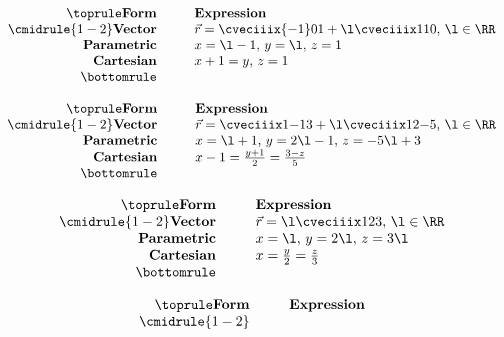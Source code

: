 \begin{solution}
    \begin{ppart}
        \[\begin{array}{r @{\hspace*{1.0cm}} l}\toprule
            \textbf{Form} & \textbf{Expression} \\\cmidrule{1-2}
            \textbf{Vector} & \vec r = \cveciiix{-1}01 + \l \cveciiix110, \, \l \in \RR \\
            \textbf{Parametric} & x = \l - 1, \, y = \l, \, z = 1 \\
            \textbf{Cartesian} & x + 1 = y, \, z = 1 \\\bottomrule
        \end{array}\]
    \end{ppart}
    \begin{ppart}
        \[\begin{array}{r @{\hspace*{1.0cm}} l}\toprule
            \textbf{Form} & \textbf{Expression} \\\cmidrule{1-2}
            \textbf{Vector} & \vec r = \cveciiix1{-1}3 + \l \cveciiix12{-5}, \, \l \in \RR \\
            \textbf{Parametric} & x = \l + 1, \, y = 2\l - 1, \, z = -5\l + 3 \\
            \textbf{Cartesian} & x-1 = \frac{y+1}2 = \frac{3-z}{5}\\\bottomrule
        \end{array}\]
    \end{ppart}
    \begin{ppart}
        \[\begin{array}{r @{\hspace*{1.0cm}} l}\toprule
            \textbf{Form} & \textbf{Expression} \\\cmidrule{1-2}
            \textbf{Vector} & \vec r = \l \cveciiix123, \, \l \in \RR \\
            \textbf{Parametric} & x = \l, \, y = 2\l, \, z = 3\l \\
            \textbf{Cartesian} & x = \frac{y}2 = \frac{z}3\\\bottomrule
        \end{array}\]
    \end{ppart}
    \begin{ppart}
        \[\begin{array}{r @{\hspace*{1.0cm}} l}\toprule
            \textbf{Form} & \textbf{Expression} \\\cmidrule{1-2}

\end{array}\]
\end{ppart}
\end{solution}
